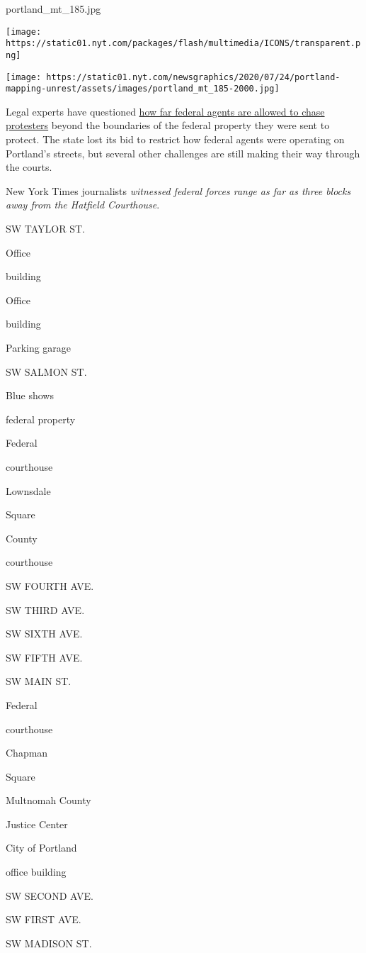 portland\_mt\_185.jpg

\texttt{[image: https://static01.nyt.com/packages/flash/multimedia/ICONS/transparent.png]}

\texttt{[image: https://static01.nyt.com/newsgraphics/2020/07/24/portland-mapping-unrest/assets/images/portland\_mt\_185-2000.jpg]}

Legal experts have questioned
\href{https://www.nytimes.com/2020/07/25/us/portland-federal-legal-jurisdiction-courts.html}{how
far federal agents are allowed to chase protesters} beyond the
boundaries of the federal property they were sent to protect. The state
lost its bid to restrict how federal agents were operating on Portland's
streets, but several other challenges are still making their way through
the courts.

New York Times journalists \emph{witnessed federal forces range as far
as three blocks away from the Hatfield Courthouse}.

SW TAYLOR ST.

Office

building

Office

building

Parking garage

SW SALMON ST.

Blue shows

federal property

Federal

courthouse

Lownsdale

Square

County

courthouse

SW FOURTH AVE.

SW THIRD AVE.

SW SIXTH AVE.

SW FIFTH AVE.

SW MAIN ST.

Federal

courthouse

Chapman

Square

Multnomah County

Justice Center

City of Portland

office building

SW SECOND AVE.

SW FIRST AVE.

SW MADISON ST.

